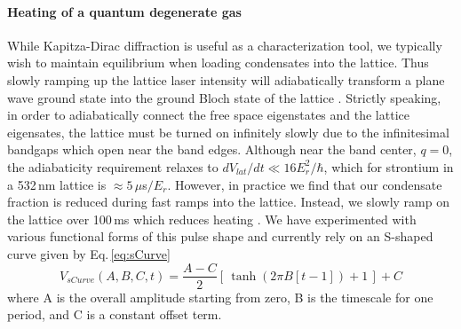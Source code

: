 \paragraph{Heating of a quantum degenerate gas}
While Kapitza-Dirac diffraction is useful as a characterization tool, we typically wish to maintain equilibrium when loading condensates into the lattice. 
Thus slowly ramping up the lattice laser intensity will adiabatically transform a plane wave ground state into the ground Bloch state of the lattice \cite{Sakurai2010}. 
Strictly speaking, in order to adiabatically connect the free space eigenstates and the lattice eigensates, the lattice must be turned on infinitely slowly due to the infinitesimal bandgaps which open near the band edges. 
Although near the band center, $q=0$, the adiabaticity requirement relaxes to $dV_{lat}/dt \ll 16E_r^2/ \hbar$, \cite{Denschlag2002} which for strontium in a 532\,nm lattice is $\approx 5\,\mu$s$/E_r$. 
However, in practice we find that our condensate fraction is reduced during fast ramps into the lattice. 
Instead, we slowly ramp on the lattice over 100\,ms which reduces heating \cite{Blakie2004}. 
We have experimented with various functional forms of this pulse shape and currently rely on an S-shaped curve given by Eq.\,\ref{eq:sCurve}
\begin{equation} \label{eq:sCurve}
	V_{sCurve}(A,B,C,t) = \frac{A-C}{2} \left[ \, \tanh (2 \pi B[t-1])+1 \, \right] + C
\end{equation}
where A is the overall amplitude starting from zero, B is the timescale for one period, and C is a constant offset term.

